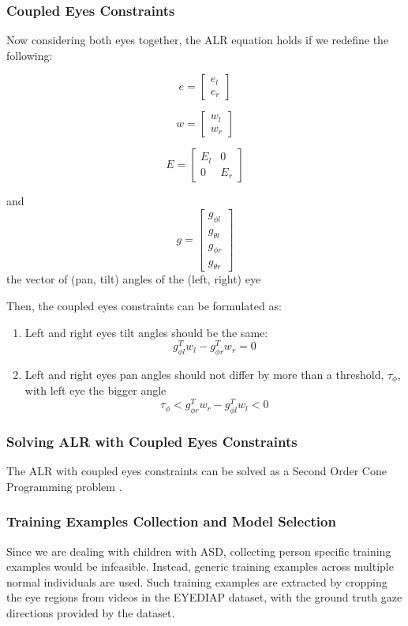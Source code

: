 \documentclass{ut-thesis}
\begin{document}
\subsubsection{Coupled Eyes Constraints}
Now considering both eyes together, the ALR equation holds if we redefine the following:

\[  e = \begin{bmatrix}
e_l \\ e_r
\end{bmatrix}   \]

\[  w = \begin{bmatrix}
w_l \\ w_r
\end{bmatrix}   \]

\[  E = \begin{bmatrix}
E_l	&	0 \\
0	&	E_r
\end{bmatrix}  \]

and \[g = \begin{bmatrix}
g_{\phi l} \\ g_{\theta l} \\ g_{\phi r} \\ g_{\theta r}
\end{bmatrix}  \]
the vector of (pan, tilt) angles of the (left, right) eye

Then, the coupled eyes constraints can be formulated as: 
\begin{enumerate}
	\item Left and right eyes tilt angles should be the same:
	\[ g_{\phi l}^T w_l -  g_{\phi r}^T w_r = 0 \]

	\item Left and right eyes pan angles should not differ by more than a threshold, \(\tau_\phi\), with left eye the bigger angle
	\[  \tau_\phi < g_{\phi r}^T w_r - g_{\phi l}^T w_l < 0 \]
\end{enumerate}


\subsubsection{Solving ALR with Coupled Eyes Constraints}
The ALR with coupled eyes constraints can be solved as a Second Order Cone Programming problem \cite{funes2013person, kim2001second}.


\subsubsection{Training Examples Collection and Model Selection}
Since we are dealing with children with ASD, collecting person specific training examples would be infeasible.  Instead, generic training examples across multiple normal individuals are used.  Such training examples are extracted by cropping the eye regions from videos in the EYEDIAP dataset, with the ground truth gaze directions provided by the dataset.
\end{document}
